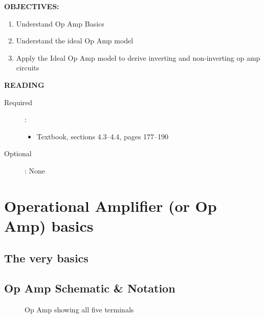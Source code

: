 \documentclass{handout}
\begin{document}
\maketitle

\textbf{OBJECTIVES:}
\begin{enumerate}
\item Understand Op Amp Basics
\item Understand the ideal Op Amp model
\item Apply the Ideal Op Amp model to derive inverting and non-inverting op amp circuits
\end{enumerate}

\textbf{READING}
\begin{description}
\item [Required]:
\begin{itemize}
\item  Textbook, sections 4.3--4.4, pages 177--190
\end{itemize}
\item [Optional]: None
\end{description}

\section{Operational Amplifier (or Op Amp) basics}
\subsection{The very basics}

\newpage
\clearpage
\pagebreak

\subsection{Op Amp Schematic \& Notation}
\begin{figure} [h! t! b!]
\centering
{}
\caption{Op Amp showing all five terminals}
\label{fig: FullOpAmp}
\end{figure}
\end{document}
